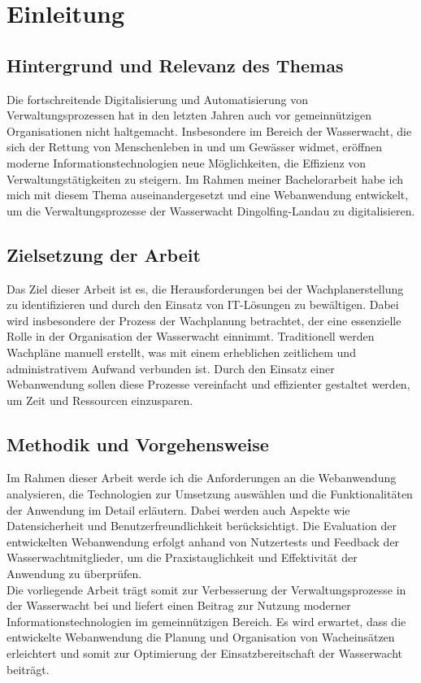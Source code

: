 \documentclass[fontsize=12pt,openright,oneside,paper=a4,BCOR=1cm]{scrbook}
\begin{document}



\tableofcontents

%
%

\chapter{Einleitung}
\section{Hintergrund und Relevanz des Themas}
Die fortschreitende Digitalisierung und Automatisierung von Verwaltungsprozessen hat in den letzten Jahren auch vor gemeinnützigen Organisationen nicht haltgemacht. Insbesondere im Bereich der Wasserwacht, die sich der Rettung von Menschenleben in und um Gewässer widmet, eröffnen moderne Informationstechnologien neue Möglichkeiten, die Effizienz von Verwaltungstätigkeiten zu steigern. Im Rahmen meiner Bachelorarbeit habe ich mich mit diesem Thema auseinandergesetzt und eine Webanwendung entwickelt, um die Verwaltungsprozesse der Wasserwacht Dingolfing-Landau zu digitalisieren. 
\\
\section{Zielsetzung der Arbeit}
Das Ziel dieser Arbeit ist es, die Herausforderungen bei der Wachplanerstellung zu identifizieren und durch den Einsatz von IT-Lösungen zu bewältigen. Dabei wird insbesondere der Prozess der Wachplanung betrachtet, der eine essenzielle Rolle in der Organisation der Wasserwacht einnimmt. Traditionell werden Wachpläne manuell erstellt, was mit einem erheblichen zeitlichem und administrativem Aufwand verbunden ist. Durch den Einsatz einer Webanwendung sollen diese Prozesse vereinfacht und effizienter gestaltet werden, um Zeit und Ressourcen einzusparen. 
\\
\section{Methodik und Vorgehensweise}
Im Rahmen dieser Arbeit werde ich die Anforderungen an die Webanwendung analysieren, die Technologien zur Umsetzung auswählen und die Funktionalitäten der Anwendung im Detail erläutern. Dabei werden auch Aspekte wie Datensicherheit und Benutzerfreundlichkeit berücksichtigt. Die Evaluation der entwickelten Webanwendung erfolgt anhand von Nutzertests und Feedback der Wasserwachtmitglieder, um die Praxistauglichkeit und Effektivität der Anwendung zu überprüfen. 
\\
Die vorliegende Arbeit trägt somit zur Verbesserung der Verwaltungsprozesse in der Wasserwacht bei und liefert einen Beitrag zur Nutzung moderner Informationstechnologien im gemeinnützigen Bereich. Es wird erwartet, dass die entwickelte Webanwendung die Planung und Organisation von Wacheinsätzen erleichtert und somit zur Optimierung der Einsatzbereitschaft der Wasserwacht beiträgt. 
\\
\end{document}
